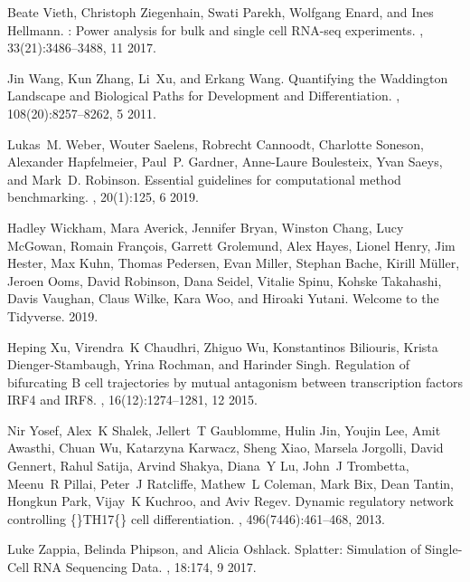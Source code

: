 \documentclass[10pt, a4paper]{article}
\begin{document}
\begin{thebibliography}{10}
	Beate Vieth, Christoph Ziegenhain, Swati Parekh, Wolfgang Enard, and Ines
	Hellmann.
	: Power analysis for bulk and single cell {{RNA}}-seq
	experiments.
	, 33(21):3486--3488, 11 2017.
	
	Jin Wang, Kun Zhang, Li~Xu, and Erkang Wang.
	\newblock Quantifying the {{Waddington Landscape}} and {{Biological Paths}} for
	{{Development}} and {{Differentiation}}.
	,
	108(20):8257--8262, 5 2011.
	
	Lukas~M. Weber, Wouter Saelens, Robrecht Cannoodt, Charlotte Soneson, Alexander
	Hapfelmeier, Paul~P. Gardner, Anne-Laure Boulesteix, Yvan Saeys, and Mark~D.
	Robinson.
	\newblock Essential guidelines for computational method benchmarking.
	, 20(1):125, 6 2019.
	
	Hadley Wickham, Mara Averick, Jennifer Bryan, Winston Chang, Lucy McGowan,
	Romain Fran{\c c}ois, Garrett Grolemund, Alex Hayes, Lionel Henry, Jim
	Hester, Max Kuhn, Thomas Pedersen, Evan Miller, Stephan Bache, Kirill
	M{\"u}ller, Jeroen Ooms, David Robinson, Dana Seidel, Vitalie Spinu, Kohske
	Takahashi, Davis Vaughan, Claus Wilke, Kara Woo, and Hiroaki Yutani.
	\newblock Welcome to the {{Tidyverse}}.
	 2019.
	
	Heping Xu, Virendra~K Chaudhri, Zhiguo Wu, Konstantinos Biliouris, Krista
	Dienger-Stambaugh, Yrina Rochman, and Harinder Singh.
	\newblock Regulation of bifurcating {{B}} cell trajectories by mutual
	antagonism between transcription factors {{IRF4}} and {{IRF8}}.
	, 16(12):1274--1281, 12 2015.
	
	Nir Yosef, Alex~K Shalek, Jellert~T Gaublomme, Hulin Jin, Youjin Lee, Amit
	Awasthi, Chuan Wu, Katarzyna Karwacz, Sheng Xiao, Marsela Jorgolli, David
	Gennert, Rahul Satija, Arvind Shakya, Diana~Y Lu, John~J Trombetta, Meenu~R
	Pillai, Peter~J Ratcliffe, Mathew~L Coleman, Mark Bix, Dean Tantin, Hongkun
	Park, Vijay~K Kuchroo, and Aviv Regev.
	\newblock Dynamic regulatory network controlling
	\{\vphantom\}{{TH17}}\vphantom\{\} cell differentiation.
	, 496(7446):461--468, 2013.
	
	Luke Zappia, Belinda Phipson, and Alicia Oshlack.
	\newblock Splatter: {{Simulation}} of {{Single}}-{{Cell RNA Sequencing Data}}.
	, 18:174, 9 2017.
	

\end{thebibliography}
\end{document}
